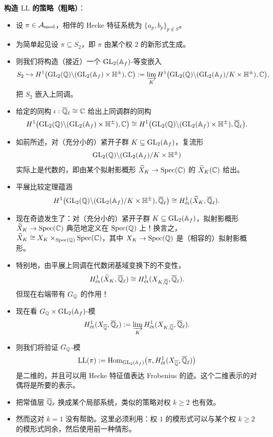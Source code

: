 \textbf{构造 $\mathrm{LL}$ 的策略（粗略）}：
\begin{itemize}
\item 设 $\pi\in\mathcal{A}_{\mathrm{mod}}$，相伴的 Hecke 特征系统为 $\{a_p,b_p\}_{p\notin S}$。
\item 为简单起见设 $\pi\subseteq S_2$，即 $\pi$ 由某个权 $2$ 的新形式生成。
\item 则我们将构造（接近）一个 $\operatorname{GL}_2(\mathbb{A}_f)$-等变嵌入
\[
S_2\hookrightarrow H^1\bigl(\operatorname{GL}_2(\mathbb{Q})\backslash(\operatorname{GL}_2(\mathbb{A}_f)\times\mathbb{H}^\pm),\mathbb{C}\bigr)
:=\varinjlim_{K}H^1\bigl(\operatorname{GL}_2(\mathbb{Q})\backslash(\operatorname{GL}_2(\mathbb{A}_f)/K\times\mathbb{H}^\pm),\mathbb{C}\bigr),
\]
把 $S_2$ 嵌入上同调。
\item 给定的同构 $\iota:\overline{\mathbb{Q}}_\ell\cong\mathbb{C}$ 给出上同调群的同构
\[
H^1\bigl(\operatorname{GL}_2(\mathbb{Q})\backslash(\operatorname{GL}_2(\mathbb{A}_f)\times\mathbb{H}^\pm),\mathbb{C}\bigr)
\cong H^1\bigl(\operatorname{GL}_2(\mathbb{Q})\backslash(\operatorname{GL}_2(\mathbb{A}_f)\times\mathbb{H}^\pm),\overline{\mathbb{Q}}_\ell\bigr).
\]
\item 如前所述，对（充分小的）紧开子群 $K\subseteq\operatorname{GL}_2(\mathbb{A}_f)$，复流形
\[
\operatorname{GL}_2(\mathbb{Q})\backslash(\operatorname{GL}_2(\mathbb{A}_f)/K\times\mathbb{H}^\pm)
\]
实际上是代数的，即由某个拟射影概形 $\widetilde X_K\to\operatorname{Spec}(\mathbb{C})$ 的 $\widetilde X_K(\mathbb{C})$ 给出。
\item 平展比较定理蕴涵
\[
H^1\bigl(\operatorname{GL}_2(\mathbb{Q})\backslash(\operatorname{GL}_2(\mathbb{A}_f)/K\times\mathbb{H}^\pm),\overline{\mathbb{Q}}_\ell\bigr)
\cong H^1_{\text{ét}}(\widetilde X_K,\overline{\mathbb{Q}}_\ell).
\]
\item 现在奇迹发生了：对（充分小的）紧开子群 $K\subseteq\operatorname{GL}_2(\mathbb{A}_f)$，拟射影概形 $\widetilde X_K\to\operatorname{Spec}(\mathbb{C})$ 典范地定义在 $\operatorname{Spec}(\mathbb{Q})$ 上！换言之，$\widetilde X_K\cong X_K\times_{\operatorname{Spec}(\mathbb{Q})}\operatorname{Spec}(\mathbb{C})$，其中 $X_K\to\operatorname{Spec}(\mathbb{Q})$ 是（相容的）拟射影概形。
\item 特别地，由平展上同调在代数闭基域变换下的不变性，
\[
H^1_{\text{ét}}(\widetilde X_K,\overline{\mathbb{Q}}_\ell)\cong H^1_{\text{ét}}(X_{K,\overline{\mathbb{Q}}},\overline{\mathbb{Q}}_\ell).
\]
但现在右端带有 $G_{\mathbb{Q}}$ 的作用！
\item 现在看 $G_{\mathbb{Q}}\times\operatorname{GL}_2(\mathbb{A}_f)$-模
\[
H^1_{\text{ét}}(X_{\overline{\mathbb{Q}}},\overline{\mathbb{Q}}_\ell)
:=\varinjlim_{K}H^1_{\text{ét}}(X_{K,\overline{\mathbb{Q}}},\overline{\mathbb{Q}}_\ell).
\]
\item 则我们将验证 $G_{\mathbb{Q}}$-模
\[
\mathrm{LL}(\pi):=\operatorname{Hom}_{\operatorname{GL}_2(\mathbb{A}_f)}\bigl(\pi,H^1_{\text{ét}}(X_{\overline{\mathbb{Q}}},\overline{\mathbb{Q}}_\ell)\bigr)
\]
是二维的，并且可以用 Hecke 特征值表达 Frobenius 的迹。这个二维表示的对偶将是所要的表示。
\item 把常值层 $\overline{\mathbb{Q}}_\ell$ 换成某个局部系统，类似的策略对权 $k\ge2$ 也有效。
\end{itemize}

\begin{itemize}
\item 然而这对 $k=1$ 没有帮助。这里必须利用：权 $1$ 的模形式可以与某个权 $k\ge2$ 的模形式同余，然后使用前一种情形。
\end{itemize}
